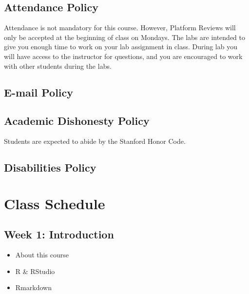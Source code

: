 \documentclass[11pt,]{article}
\providecommand{\tightlist}{%
  \setlength{\itemsep}{0pt}\setlength{\parskip}{0pt}}
\begin{document}
\hypertarget{attendance-policy}{%
\subsection{Attendance Policy}\label{attendance-policy}}

Attendance is not mandatory for this course. However, Platform Reviews
will only be accepted at the beginning of class on Mondays. The labs are
intended to give you enough time to work on your lab assignment in
class. During lab you will have access to the instructor for questions,
and you are encouraged to work with other students during the labs.

\hypertarget{e-mail-policy}{%
\subsection{E-mail Policy}\label{e-mail-policy}}

\hypertarget{academic-dishonesty-policy}{%
\subsection{Academic Dishonesty
Policy}\label{academic-dishonesty-policy}}

Students are expected to abide by the Stanford Honor Code.

\hypertarget{disabilities-policy}{%
\subsection{Disabilities Policy}\label{disabilities-policy}}

\newpage

\hypertarget{class-schedule}{%
\section{Class Schedule}\label{class-schedule}}

\hypertarget{week-1-introduction}{%
\subsection{Week 1: Introduction}\label{week-1-introduction}}

\begin{itemize}
\tightlist
\item
  About this course
\item
  R \& RStudio
\item
  Rmarkdown
\end{itemize}
\end{document}
